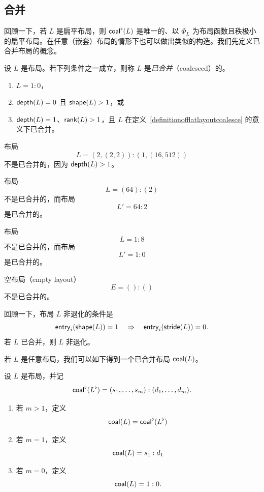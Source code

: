 \subsection{合并}

回顾一下，若 $L$ 是扁平布局，则 $\mathsf{coal}^\flat(L)$ 是唯一的、以 $\Phi_L$ 为布局函数且秩极小的扁平布局。在任意（嵌套）布局的情形下也可以做出类似的构造。我们先定义已合并布局的概念。


\begin{definition}\label{definitionofnestedlayoutcoalesce}
    设 $L$ 是布局。若下列条件之一成立，则称 $L$ 是{\it 已合并}（coalesced）的。
    \begin{enumerate}
    \item $L = 1:0$，
    \item $\mathsf{depth}(L) = 0$ 且 $\mathsf{shape}(L) > 1$，或
    \item $\mathsf{depth}(L) = 1$、$\mathsf{rank}(L) > 1$，且 $L$ 在定义~\ref{definitionofflatlayoutcoalesce} 的意义下已合并。
    \end{enumerate}
\end{definition}

\begin{example}
    布局
    \[L = (2,(2,2)) : (1,(16,512))\]
    不是已合并的，因为 $\mathsf{depth}(L)>1$。
\end{example}
\begin{example}
    布局 \[L = (64):(2)\] 不是已合并的，而布局 \[L' = 64:2\] 是已合并的。
\end{example}
\begin{example}
    布局 \[L = 1:8\] 不是已合并的，而布局 \[L' = 1:0\] 是已合并的。
\end{example}
\begin{example}
    空布局（empty layout）
    \[E = ():()\]
    不是已合并的。
\end{example}

\begin{observation}
    回顾一下，布局 $L$ 非退化的条件是
    \[
    \mathsf{entry}_i(\mathsf{shape}(L)) = 1 \quad \Rightarrow \quad  \mathsf{entry}_i(\mathsf{stride}(L)) = 0.
    \]
    若 $L$ 已合并，则 $L$ 非退化。
\end{observation}
若 $L$ 是任意布局，我们可以如下得到一个已合并布局 $\mathsf{coal}(L)$。

\begin{construction}\label{constructionoflayoutcoalesce}
    设 $L$ 是布局，并记
    \[\mathsf{coal}^\flat(L^\flat) = (s_1,\dots,s_m):(d_1,\dots,d_m).\]
    \begin{enumerate}
        \item 若 $m > 1$，定义
        \[
        \mathsf{coal}(L) = \mathsf{coal}^\flat(L^\flat)
        \]
        \item 若 $m = 1$，定义
        \[
        \mathsf{coal}(L) = s_1:d_1
        \]
        \item 若 $m = 0$，定义
        \[ \mathsf{coal}(L) = 1:0.\]
    \end{enumerate}
\end{construction}

